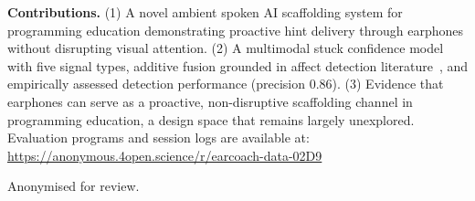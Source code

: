 \documentclass[sigconf,anonymous,review]{acmart}
\begin{document}
\textbf{Contributions.}
(1) A novel ambient spoken AI scaffolding system for programming
education demonstrating proactive hint delivery through earphones without
disrupting visual attention.
(2) A multimodal stuck confidence model with five signal types, additive
fusion grounded in affect detection literature~\cite{dmellokory2015},
and empirically assessed detection performance (precision 0.86).
(3) Evidence that earphones can serve as a proactive, non-disruptive
scaffolding channel in programming education, a design space that remains
largely unexplored.
Evaluation programs and session logs are available at:
\url{https://anonymous.4open.science/r/earcoach-data-02D9}

\begin{acks}
Anonymised for review.
\end{acks}



\end{document}
